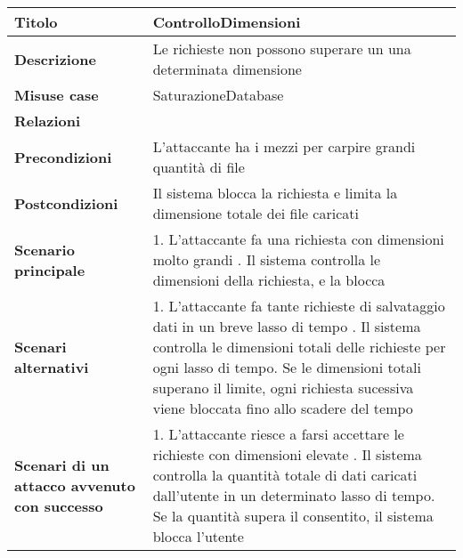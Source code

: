 \begin{tabular} {|P{4cm}|P{13cm}|}
  \hline
  \textbf{Titolo}                                      & ControlloDimensioni                                                                          \\
  \hline
  \textbf{Descrizione}                                 & Le richieste non possono superare un una determinata dimensione                              \\
  \hline
  \textbf{Misuse case}                                 & SaturazioneDatabase                                                                          \\
  \hline
  \textbf{Relazioni}                                   &                                                                                              \\
  \hline
  \textbf{Precondizioni}                               & L'attaccante ha i mezzi per carpire grandi quantità di file                                  \\
  \hline
  \textbf{Postcondizioni}                              & Il sistema blocca la richiesta e limita la dimensione totale dei file caricati               \\
  \hline
  \textbf{Scenario principale}                         & 1. L'attaccante fa una richiesta con dimensioni molto grandi . Il sistema controlla le dimensioni della richiesta, e la blocca                                                                                  \\
  \hline
  \textbf{Scenari alternativi}                         & 1. L'attaccante fa tante richieste di salvataggio dati in un breve lasso di tempo . Il sistema controlla le dimensioni totali delle richieste per ogni lasso di tempo. Se le dimensioni totali superano il limite, ogni richiesta sucessiva viene bloccata fino allo scadere del tempo                                  \\
  \hline
  \textbf{Scenari di un attacco avvenuto con successo} & 1. L'attaccante riesce a farsi accettare le richieste con dimensioni elevate . Il sistema controlla la quantità totale di dati caricati dall'utente in un determinato lasso di tempo. Se la quantità supera il consentito, il sistema blocca l'utente                                                                                  \\
  \hline
\end{tabular}
\hfill
\break

